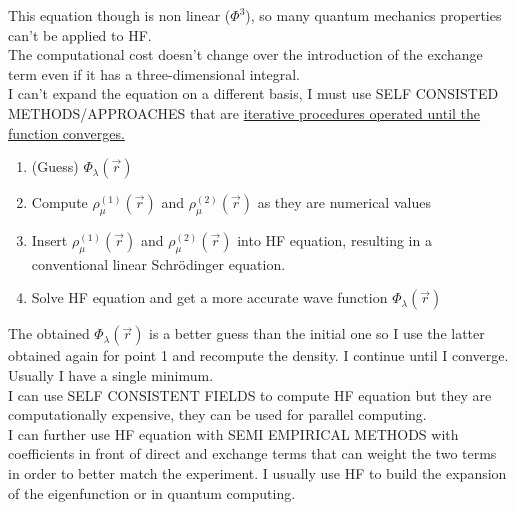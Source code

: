 This equation though is non linear ($\Phi^3$), so many quantum mechanics properties can't be applied to HF.\\
The computational cost doesn't change over the introduction of the exchange term even if it has a three-dimensional integral.\\
I can't expand the equation on a different basis, I must use SELF CONSISTED METHODS/APPROACHES that are \ul{iterative procedures operated until the function converges.}
\begin{enumerate}
	\item (Guess) $\Phi_\lambda (\vec{r})$
	\item Compute $\rho_\mu^{(1)}(\vec{r})$ and $\rho_\mu^{(2)}(\vec{r})$ as they are numerical values
	\item Insert $\rho_\mu^{(1)}(\vec{r})$ and $\rho_\mu^{(2)}(\vec{r})$ into HF equation, resulting in a conventional linear Schr\"odinger equation.
	\item Solve HF equation and get a more accurate wave function $\Phi_\lambda (\vec{r})$
	\end{enumerate}
The obtained $\Phi_\lambda (\vec{r})$ is a better guess than the initial one so I use the latter obtained again for point 1 and recompute the density. I continue until I converge. Usually I have a single minimum. \\
I can use SELF CONSISTENT FIELDS to compute HF equation but they are computationally expensive, they can be used for parallel computing. \\

I can further use HF equation with SEMI EMPIRICAL METHODS with coefficients in front of direct and exchange terms that can weight the two terms in order to better match the experiment. I usually use HF to build the expansion of the eigenfunction or in quantum computing.\\

